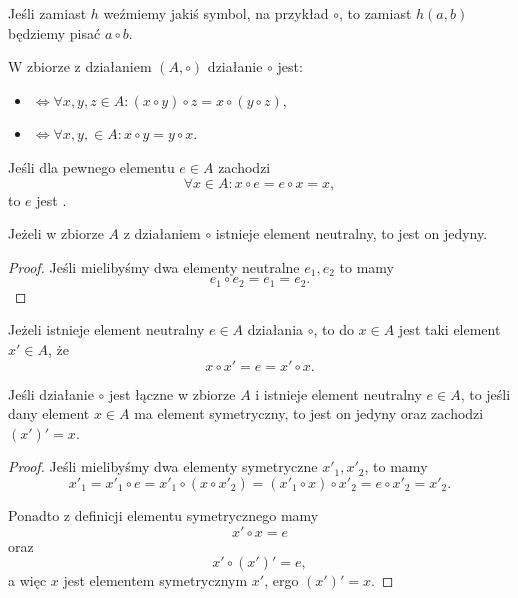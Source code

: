 Jeśli zamiast $h$ weźmiemy jakiś symbol, na przykład $\circ$, to zamiast $h(a, b)$ będziemy pisać $a \circ b$.

\begin{definition}
    W zbiorze z działaniem $(A, \circ)$ działanie $\circ$ jest:
    \begin{itemize}[--]
        \item {} $\iff \forall x, y, z \in A : (x \circ y) \circ z = x \circ (y \circ z)$,
        \item {} $\iff \forall x, y, \in A : x \circ y = y \circ x$.
    \end{itemize}
\end{definition}

Jeśli dla pewnego elementu $e \in A$ zachodzi
$$ \forall x \in A : x \circ e = e \circ x = x, $$
to $e$ jest .

\begin{fact}
    Jeżeli w zbiorze $A$ z działaniem $\circ$ istnieje element neutralny, to jest on jedyny.
\end{fact}
\begin{proof}
    Jeśli mielibyśmy dwa elementy neutralne $e_1, e_2$ to mamy
    $$ e_1 \circ e_2 = e_1 = e_2. $$
\end{proof}

Jeżeli istnieje element neutralny $e \in A$ działania $\circ$, to  do $x \in A$ jest taki element $x' \in A$, że
$$ x \circ x' = e = x' \circ x. $$

\begin{lemma}
    Jeśli działanie $\circ$ jest łączne w zbiorze $A$ i istnieje element neutralny $e \in A$, to jeśli dany element $x \in A$ ma element symetryczny, to jest on jedyny oraz zachodzi $(x')' = x$.
\end{lemma}
\begin{proof}
    Jeśli mielibyśmy dwa elementy symetryczne $x'_1, x'_2$, to mamy
    $$ x'_1 = x'_1 \circ e = x'_1 \circ (x \circ x'_2) = (x'_1 \circ x) \circ x'_2 = e \circ x'_2 = x'_2. $$

    Ponadto z definicji elementu symetrycznego mamy
    $$ x' \circ x = e $$
    oraz
    $$ x' \circ (x')' = e, $$
    a więc $x$ jest elementem symetrycznym $x'$, ergo $(x')' = x$.
\end{proof}